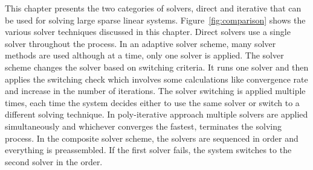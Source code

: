 This chapter presents the two categories of solvers, direct and iterative that can be used for solving large sparse linear systems. Figure~\ref{fig:comparison} shows the various solver techniques discussed in this chapter. Direct solvers use a single solver throughout the process. In an adaptive solver scheme, many solver methods are used although at a time, only one solver is applied. The solver scheme changes the solver based on switching criteria. It runs one solver and then applies the switching check which involves some calculations like convergence rate and increase in the number of iterations. The solver switching is applied multiple times, each time the system decides either to use the same solver or switch to a different solving technique. In poly-iterative approach multiple solvers are applied simultaneously and whichever converges the fastest, terminates the solving process. In the composite solver scheme, the solvers are sequenced in order and everything is preassembled. If the first solver fails, the system switches to the second solver in the order. 


